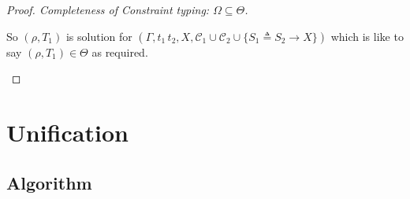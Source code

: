\documentclass[8pt]{beamer}
\begin{document}
\begin{frame}
\begin{proof}[Proof. Completeness of Constraint typing: 
        $\Omega \subseteq \Theta$]
\begin{description}
                So $(\rho, T_1)$ is solution for $(\Gamma, t_1 \, t_2,
                X, \mathcal{C}_1\cup\mathcal{C}_2\cup\{S_1\triangleq
                S_2\rightarrow X\})$
                which is like to say $(\rho, T_1)\in\Theta$ 
                as required.
        
        \end{description}
    \end{proof}
    \normalsize
\end{frame}

\section{Unification}
\subsection{Algorithm}
\end{document}
